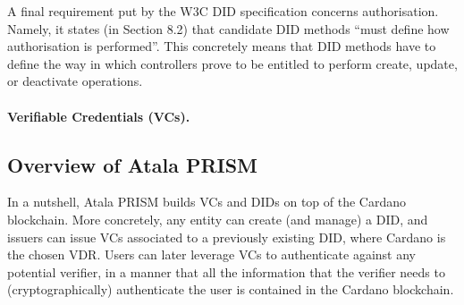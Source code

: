 A final requirement put by the W3C DID specification concerns authorisation.
Namely, it states (in Section 8.2) that candidate DID methods ``must define how
authorisation is performed''. This concretely means that DID methods have to
define the way in which controllers prove to be entitled to perform create,
update, or deactivate operations.

\paragraph{Verifiable Credentials (VCs).} %

\subsection{Overview of Atala PRISM}
\label{ssec:overview-prism}

In a nutshell, Atala PRISM builds VCs and DIDs on top of the Cardano blockchain.
More concretely, any entity can create (and manage) a DID, and issuers can issue
VCs associated to a previously existing DID, where Cardano is the chosen VDR.
Users can later leverage VCs to authenticate against any potential verifier, in
a manner that all the information that the verifier needs to (cryptographically)
authenticate the user is contained in the Cardano blockchain.



